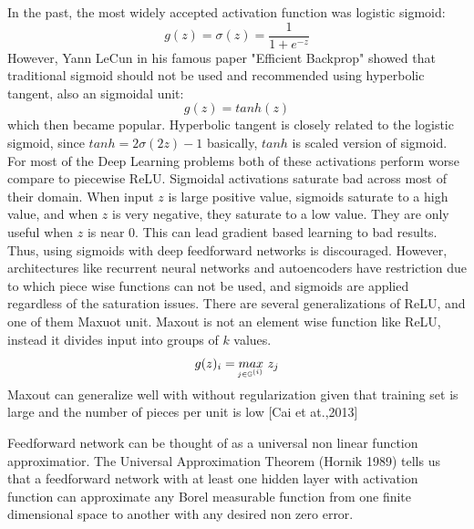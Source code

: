 \documentclass[paper=a4, fontsize=11pt]{scrartcl}
\numberwithin{equation}{section}		%
\numberwithin{figure}{section}			%
\numberwithin{table}{section}			%
\begin{document}
	
	In the past, the most widely accepted activation function was logistic sigmoid:
	 $$ g(z) = \sigma(z) = \frac{1}{1 + e^{-z}}$$
	However, Yann LeCun in his famous paper "Efficient Backprop" showed that traditional sigmoid should not be used and recommended using hyperbolic tangent, also an sigmoidal unit:
	$$ g(z) = tanh(z) $$
	which then became popular. Hyperbolic tangent is closely related to the logistic sigmoid, since $tanh = 2\sigma (2z)-1$ basically, $ tanh $ is scaled version of sigmoid. For most of the Deep Learning problems both of these activations perform worse compare to piecewise ReLU. Sigmoidal activations saturate bad across most of their domain. When input $z$ is large positive value, sigmoids saturate to a high value, and when $z$ is very negative, they saturate to a low value. They are only useful when $z$ is near 0. This can lead gradient based learning to bad results. Thus, using sigmoids with deep feedforward networks is discouraged. However, architectures like recurrent neural networks and autoencoders have restriction due to which piece wise functions can not be used, and sigmoids are applied regardless of the saturation issues. There are several generalizations of ReLU, and one of them Maxuot unit. Maxout is not an element wise function like ReLU, instead it divides input into groups of $k$ values. 
		$$ g(z)_i = \underaccent{j \in \mathbb G^{(i)}}{max} \ z_j$$
	Maxout can generalize well with without regularization given that training set is large and the number of pieces per unit is low [Cai et at.,2013]
	\par Feedforward network can be thought of as a universal non linear function approximatior. The Universal Approximation Theorem (Hornik 1989) tells us that a feedforward network with at least one hidden layer with activation function can approximate any Borel measurable function from one finite dimensional space to another with any desired non zero error.
	
\end{document}
